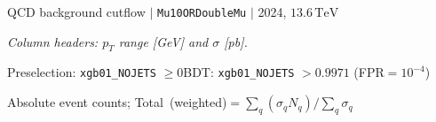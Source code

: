\documentclass[10pt,a4paper]{article}
\begin{document}
\begin{landscape}

{\large QCD background cutflow $|$ \texttt{Mu10ORDoubleMu} $|$ 2024, $13.6\,\mathrm{TeV}$}

\vspace{0.8em}

\textit{Column headers: $p_T$ range [GeV] and $\sigma$ [pb].}

Preselection: \texttt{xgb01\_NOJETS} $\geq 0$\quad BDT: \texttt{xgb01\_NOJETS} $>0.9971$ (FPR$=10^{-4}$)

\vspace{0.8em}

\vspace{18pt}

Absolute event counts; Total\ (weighted)$=\sum_q(\sigma_q N_q)/\sum_q\sigma_q$


\end{landscape}
\end{document}
